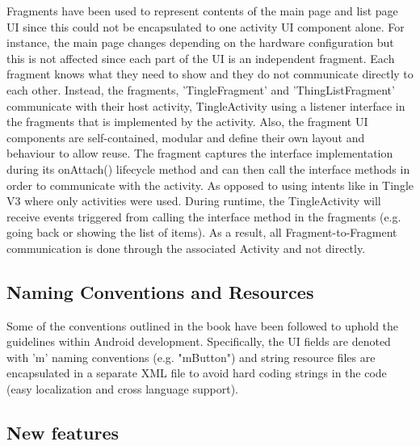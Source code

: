 \documentclass{article} %
\begin{document}

Fragments have been used to represent contents of the main page and list page UI since this could not be encapsulated to one activity UI component alone. For instance, the main page changes depending on the hardware configuration but this is not affected since each part of the UI is an independent fragment. Each fragment knows what they need to show and they do not communicate directly to each other. Instead, the fragments, 'TingleFragment' and 'ThingListFragment' communicate with their host activity, TingleActivity using a listener interface in the fragments that is implemented by the activity. Also, the fragment UI components are self-contained, modular and define their own layout and behaviour to allow reuse. The fragment captures the interface implementation during its onAttach() lifecycle method and can then call the interface methods in order to communicate with the activity. As opposed to using intents like in Tingle V3 where only activities were used. During runtime, the TingleActivity will receive events triggered from calling the interface method in the fragments (e.g. going back or showing the list of items). As a result, all Fragment-to-Fragment communication is done through the associated Activity and not directly. 

\subsection{Naming Conventions and Resources}


Some of the conventions outlined in the book have been followed to uphold the guidelines within Android development. Specifically, the UI fields are denoted with 'm' naming conventions (e.g. "mButton") and string resource files are encapsulated in a separate XML file to avoid hard coding strings in the code (easy localization and cross language support). 

\subsection{New features}
\end{document}
